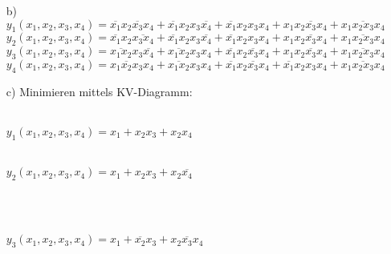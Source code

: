 \documentclass{article}
\begin{document}
\begin{itemize}
\begin{tabular}[t]{c|cccc|cccc}
    	\end{tabular}\\
    	\item[b)]$y_1(x_1,x_2,x_3,x_4)=\overline{x_1}x_2\overline{x_3}x_4 + \overline{x_1}x_2x_3\overline{x_4} + \overline{x_1}x_2x_3x_4 + x_1\overline{x_2x_3x_4} + x_1\overline{x_2x_3}x_4$\\
    	$y_2(x_1,x_2,x_3,x_4)=\overline{x_1}x_2\overline{x_3x_4} + \overline{x_1}x_2x_3\overline{x_4} + \overline{x_1}x_2x_3x_4 + x_1\overline{x_2x_3x_4} + x_1\overline{x_2x_3}x_4$\\
    	$y_3(x_1,x_2,x_3,x_4)=\overline{x_1x_2}x_3\overline{x_4} + \overline{x_1x_2}x_3x_4 + \overline{x_1}x_2\overline{x_3}x_4 + x_1\overline{x_2x_3x_4} + x_1\overline{x_2x_3}x_4$\\
    	$y_4(x_1,x_2,x_3,x_4)=\overline{x_1x_2x_3}x_4 + \overline{x_1x_2}x_3x_4 + \overline{x_1}x_2\overline{x_3}x_4 + \overline{x_1}x_2x_3x_4 + x_1\overline{x_2x_3}x_4$\\
    	\item[c)]Minimieren mittels KV-Diagramm:\\\\
    	\begin{minipage}[t]{0.45\textwidth}
    		$y_1(x_1,x_2,x_3,x_4)=x_1 + x_2x_3 + x_2x_4$\\\\
    		\begin{karnaugh-map}[4][4][1][$x_3x_4$][$x_1x_2$]
    			\autoterms[0]
    		\end{karnaugh-map}
    	\end{minipage}
    	\begin{minipage}[t]{0.45\textwidth}
    		$y_2(x_1,x_2,x_3,x_4)=x_1 + x_2x_3 + x_2\overline{x_4}$\\\\
    		\begin{karnaugh-map}[4][4][1][$x_3x_4$][$x_1x_2$]
    			\autoterms[0]
    		\end{karnaugh-map}
    	\end{minipage}\\
    	\begin{minipage}[t]{0.45\textwidth}
    		$y_3(x_1,x_2,x_3,x_4)=x_1 + \overline{x_2}x_3 + x_2\overline{x_3}x_4$\\\\

\end{minipage}
\end{itemize}
\end{document}
